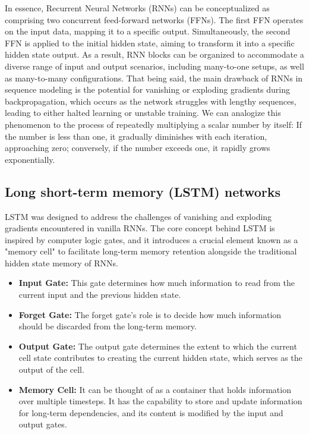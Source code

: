 \documentclass{article}
\begin{document}
In essence, Recurrent Neural Networks (RNNs) can be conceptualized as comprising two concurrent feed-forward networks (FFNs). 
The first FFN operates on the input data, mapping it to a specific output. 
Simultaneously, the second FFN is applied to the initial hidden state, aiming to transform it into a specific hidden state output.
As a result, RNN blocks can be organized to accommodate a diverse range of input and output scenarios, including many-to-one setups, as well as many-to-many configurations.
That being said, the main drawback of RNNs in sequence modeling is the potential for vanishing or exploding gradients during backpropagation, which occurs as the network struggles with lengthy sequences, leading to either halted learning or unstable training.
We can analogize this phenomenon to the process of repeatedly multiplying a scalar number by itself: If the number is less than one, it gradually diminishes with each iteration, approaching zero; conversely, if the number exceeds one, it rapidly grows exponentially.


\subsection{Long short-term memory (LSTM) networks}
LSTM was designed to address the challenges of vanishing and exploding gradients encountered in vanilla RNNs. 
The core concept behind LSTM is inspired by computer logic gates, and it introduces a crucial element known as a "memory cell" to facilitate long-term memory retention alongside the traditional hidden state memory of RNNs.

\begin{itemize}
    \item \textbf{Input Gate:} This gate determines how much information to read from the current input and the previous hidden state.
    \item \textbf{Forget Gate:} The forget gate's role is to decide how much information should be discarded from the long-term memory.
    \item \textbf{Output Gate:} The output gate determines the extent to which the current cell state contributes to creating the current hidden state, which serves as the output of the cell.
    \item \textbf{Memory Cell:} It can be thought of as a container that holds information over multiple timesteps. It has the capability to store and update information for long-term dependencies, and its content is modified by the input and output gates.
\end{itemize}
\end{document}
